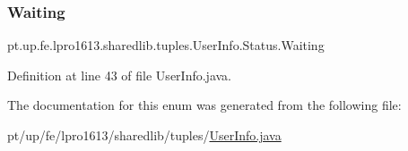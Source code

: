 \hypertarget{enumpt_1_1up_1_1fe_1_1lpro1613_1_1sharedlib_1_1tuples_1_1_user_info_1_1_status_a0137735cbcd9b5f797e37408bf500cde}{}\label{enumpt_1_1up_1_1fe_1_1lpro1613_1_1sharedlib_1_1tuples_1_1_user_info_1_1_status_a0137735cbcd9b5f797e37408bf500cde} 
\subsubsection{\texorpdfstring{Waiting}{Waiting}}
{\footnotesize\ttfamily pt.\+up.\+fe.\+lpro1613.\+sharedlib.\+tuples.\+User\+Info.\+Status.\+Waiting}



Definition at line 43 of file User\+Info.\+java.



The documentation for this enum was generated from the following file\+:\begin{DoxyCompactItemize}
\item 
pt/up/fe/lpro1613/sharedlib/tuples/\hyperlink{_user_info_8java}{User\+Info.\+java}\end{DoxyCompactItemize}
